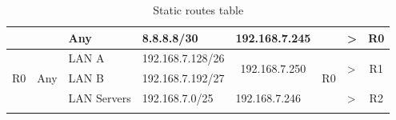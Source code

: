 \documentclass[11pt,a4paper]{report}
\begin{document}
\begin{longtable}[c]{@{}lllllclc@{}}
                                &                                & Any         & 8.8.8.8/30       & 192.168.7.245                                      &                     & \textgreater{}                  & R0                  \\* \midrule
            \multirow{3}{*}{R0} & \multirow{3}{*}{Any}           & LAN A       & 192.168.7.128/26 & \multicolumn{1}{c}{\multirow{2}{*}{192.168.7.250}} & \multirow{3}{*}{R0} & \multirow{2}{*}{\textgreater{}} & \multirow{2}{*}{R1} \\
                                &                                & LAN B       & 192.168.7.192/27 & \multicolumn{1}{c}{}                               &                     &                                 &                     \\* \cmidrule(lr){3-5} \cmidrule(l){7-8}
                                &                                & LAN Servers & 192.168.7.0/25   & 192.168.7.246                                      &                     & \textgreater{}                  & R2                  \\* \bottomrule
            \caption{Static routes table}
            \label{tab:staticroutetbl}\\
        \end{longtable}
\end{document}

